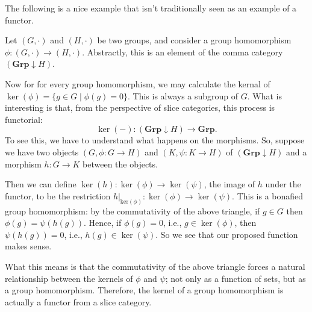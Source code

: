         The following is a nice example that isn't traditionally seen as
        an example of a functor. 

        \begin{example}
            Let $(G, \cdot)$ and $(H, \cdot)$ be two groups, and consider a group 
            homomorphism $\phi: (G, \cdot) \to (H, \cdot)$. Abstractly, this 
            is an element of the comma category $(\textbf{Grp} \downarrow H)$.
            
            Now for for every group 
            homomorphism, we may calculate 
            the kernal of $\ker(\phi) = \{g \in G \mid \phi(g) = 0\}$. This 
            is always a subgroup of $G$. What is interesting is that, 
            from the perspective of slice categories, this 
            process is functorial:
            \[
                \ker(-): (\textbf{Grp}\downarrow H) \to \textbf{Grp}.  
            \]
            To see this, we have to understand what happens on the morphisms.
            So, suppose we have two objects $(G, \phi: G \to H)$ and $(K, \psi: K \to H)$ 
            of $(\textbf{Grp}\downarrow H)$ and a morphism $h: G \to K$ between the objects. 
            \begin{center}
            \end{center}
            Then we can define $\ker(h): \ker(\phi) \to \ker(\psi)$, the image 
            of $h$ under the functor, to 
            be the restriction $h|_{\text{ker}(\phi)}: \ker(\phi) \to \ker(\psi)$. 
            This is a bonafied group homomorphism: by the commutativity of the above 
            triangle, if $g \in G$ then $\phi(g) = \psi(h(g))$. Hence, if $\phi(g) = 0$, 
            i.e., $g \in \ker(\phi)$, then $\psi(h(g)) = 0$, i.e., $h(g) \in \ker(\psi)$. 
            So we see that our proposed function makes sense. 

            What this means is that the commutativity of the above triangle forces 
            a natural relationship between the kernels of $\phi$ and $\psi$; not only 
            as a function of sets, but as a group homomorphism.
            Therefore, the kernel of a group homomorphism is actually a 
            functor from a slice category. 
        \end{example}



